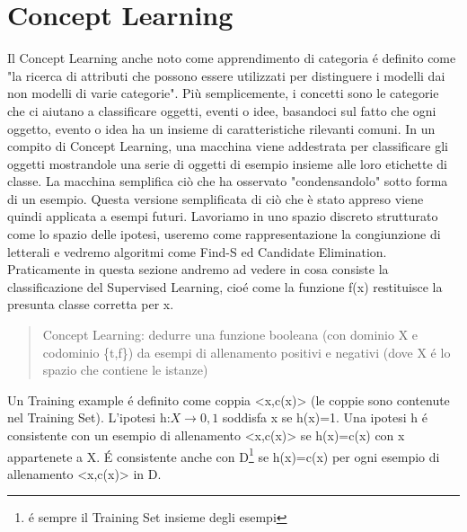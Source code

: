 \documentclass{article}
\begin{document}
\section{Concept Learning}
Il Concept Learning anche noto come apprendimento di categoria é definito come "la ricerca di attributi che possono essere utilizzati per distinguere i modelli dai non modelli di varie categorie". Più semplicemente, i concetti sono le categorie che ci aiutano a classificare oggetti, eventi o idee, basandoci sul fatto che ogni oggetto, evento o idea ha un insieme di caratteristiche rilevanti comuni. In un compito di Concept Learning, una macchina viene addestrata per classificare gli oggetti mostrandole una serie di oggetti di esempio insieme alle loro etichette di classe. La macchina semplifica ciò che ha osservato "condensandolo" sotto forma di un esempio. Questa versione semplificata di ciò che è stato appreso viene quindi applicata a esempi futuri. \newline
Lavoriamo in uno spazio discreto strutturato come lo spazio delle ipotesi, useremo come rappresentazione la congiunzione di letterali e vedremo algoritmi come Find-S ed Candidate Elimination. Praticamente in questa sezione andremo ad vedere in cosa consiste la classificazione del Supervised Learning, cioé come la funzione f(x) restituisce la presunta classe corretta per x.

\begin{quote}
    Concept Learning: dedurre una funzione booleana (con dominio X e codominio \{t,f\}) da esempi di allenamento positivi e negativi (dove X é lo spazio che contiene le istanze)
\end{quote}
Un Training example é definito come coppia <x,c(x)> (le coppie sono contenute nel Training Set). \newline
L'ipotesi h:$X \rightarrow {0,1}$ soddisfa x se h(x)=1. \newline
Una ipotesi h é consistente con un esempio di allenamento <x,c(x)> se h(x)=c(x) con x appartenete a X. É consistente anche con D\footnote{é sempre il Training Set insieme degli esempi} se h(x)=c(x) per ogni esempio di allenamento <x,c(x)> in D.
\end{document}
